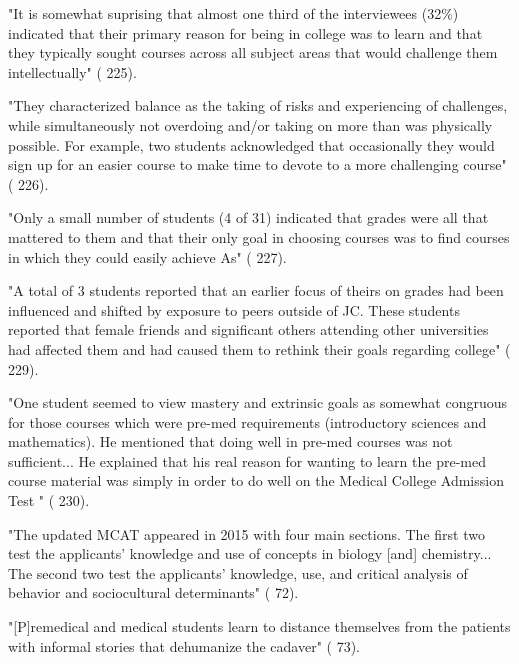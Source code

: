 

"It is somewhat suprising that almost one third of the interviewees (32\%) indicated that their primary reason for being in college was to learn and that they typically sought courses across all subject areas that would challenge them intellectually" (\cite{Horowitz-2010} 225).

"They
characterized balance as the taking of risks and experiencing of challenges, while simultaneously not overdoing and/or taking on more than was physically possible. For example, two students acknowledged that occasionally they would sign up for an easier course to make time to devote to a more challenging course" (\cite{Horowitz-2010} 226).


"Only a small number of students (4 of 31) indicated that grades were all that mattered to them and that their only goal in choosing courses was to find courses in which they could easily achieve As" (\cite{Horowitz-2010} 227).

"A total of 3 students reported that an earlier focus of theirs on grades had been influenced and shifted by exposure to peers outside of JC. These students reported that female friends and significant others attending other universities had affected them and had caused them to rethink their goals regarding college" (\cite{Horowitz-2010} 229).

"One student seemed to view mastery and extrinsic goals as somewhat congruous for those courses which were pre-med requirements (introductory sciences and mathematics). He mentioned that doing well in pre-med courses was not sufficient... He explained that his real reason for wanting to learn the pre-med course material was simply in order to do well on the Medical College Admission Test " (\cite{Horowitz-2010} 230).




"The updated MCAT appeared in 2015 with four main sections. The first two test the applicants' knowledge and use of concepts in biology [and] chemistry... The second two test the applicants' knowledge, use, and critical analysis of behavior and sociocultural determinants" (\cite{Olsen-2016} 72).

"[P]remedical and medical students learn to distance themselves from the patients with informal stories that dehumanize the cadaver" (\cite{Olsen-2016} 73).


